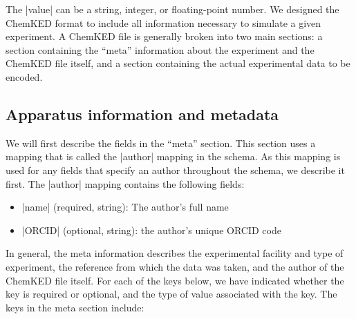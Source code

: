 \documentclass[12pt]{ijck}
\newcommand\ck{ChemKED}
\begin{document}
The \yabox|value| can be a string, integer, or floating-point number. We designed
the \ck{} format to include all information necessary to simulate a
given experiment. A \ck{} file is generally broken into two main sections: a section containing the
``meta'' information about the experiment and the \ck{} file itself, and a section containing the
actual experimental data to be encoded.

\subsection{Apparatus information and metadata}
\label{sec:apparatus-information-and-metadata}

We will first describe the fields in the ``meta'' section.
This section uses a mapping that is called the \yabox|author| mapping in the schema. As this mapping
is used for any fields that specify an author throughout the schema, we describe it first.
The \yabox|author| mapping contains the following fields:
%
\begin{itemize}
    \item \yabox|name| (required, string): The author's full name
    \item \yabox|ORCID| (optional, string): the author's unique ORCID code
\end{itemize}
%
In general, the meta information describes the experimental facility and type of experiment, the
reference from which the data was taken, and the author of the \ck{} file itself. For each of the
keys below, we have indicated whether the key is required or optional, and the type of value
associated with the key. The keys in the meta section include:
%
\end{document}
